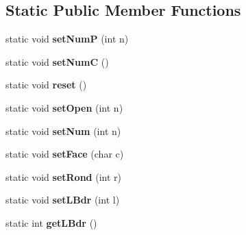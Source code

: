 \subsection*{Static Public Member Functions}
\begin{DoxyCompactItemize}
\item 
\hypertarget{class_player_a14c0aeb69509335a4e91a0b49d103bf1}{}static void {\bfseries set\+Num\+P} (int n)\label{class_player_a14c0aeb69509335a4e91a0b49d103bf1}

\item 
\hypertarget{class_player_a1476aaca70e47b36c20266d714ab6518}{}static void {\bfseries set\+Num\+C} ()\label{class_player_a1476aaca70e47b36c20266d714ab6518}

\item 
\hypertarget{class_player_a1af5d39f7bac2aeaa1e30c7dda2332fa}{}static void {\bfseries reset} ()\label{class_player_a1af5d39f7bac2aeaa1e30c7dda2332fa}

\item 
\hypertarget{class_player_aab4d4f2f0e6e7249aaa0b03b82844fb1}{}static void {\bfseries set\+Open} (int n)\label{class_player_aab4d4f2f0e6e7249aaa0b03b82844fb1}

\item 
\hypertarget{class_player_a0afc5317b14978b06caf4df9dfdef58c}{}static void {\bfseries set\+Num} (int n)\label{class_player_a0afc5317b14978b06caf4df9dfdef58c}

\item 
\hypertarget{class_player_abbeccad95b0cf837fc589bdb7fae36b9}{}static void {\bfseries set\+Face} (char c)\label{class_player_abbeccad95b0cf837fc589bdb7fae36b9}

\item 
\hypertarget{class_player_a213e2ef93da1ea5e5c5a9891c5b1d14e}{}static void {\bfseries set\+Rond} (int r)\label{class_player_a213e2ef93da1ea5e5c5a9891c5b1d14e}

\item 
\hypertarget{class_player_a992ec6a8d5cbc971b38d87cf0232a5de}{}static void {\bfseries set\+L\+Bdr} (int l)\label{class_player_a992ec6a8d5cbc971b38d87cf0232a5de}

\item 
\hypertarget{class_player_ab5deb6987c7972da5ac4b15cc73ed0fe}{}static int {\bfseries get\+L\+Bdr} ()\label{class_player_ab5deb6987c7972da5ac4b15cc73ed0fe}

\end{DoxyCompactItemize}
